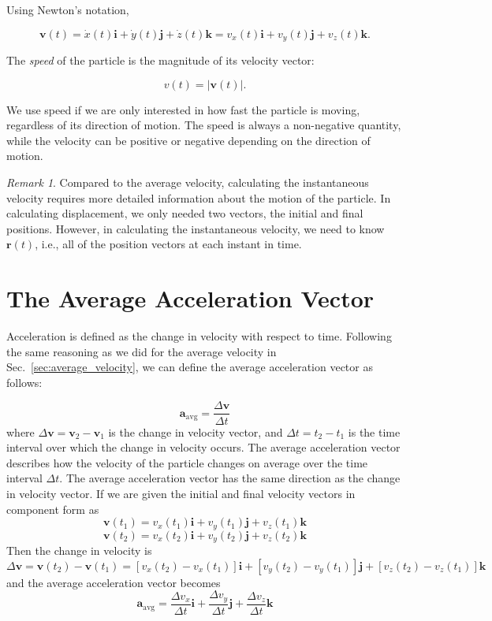 \documentclass[12pt]{article}
\theoremstyle{remark}
\newtheorem*{remark}{Remark}
\begin{document}
Using Newton's notation,

\begin{equation}
\mathbf{v}(t)
=
\dot{x}(t)\mathbf{i}
+
\dot{y}(t)\mathbf{j}
+
\dot{z}(t)\mathbf{k}
=
v_x(t)\mathbf{i}
+
v_y(t)\mathbf{j}
+
v_z(t)\mathbf{k}.
\end{equation}

The \emph{speed} of the particle is the magnitude of its velocity vector:

\begin{equation}
v(t)
=
\lvert\mathbf{v}(t)\rvert.
\end{equation}

We use speed if we are only interested in how fast the particle is moving, regardless of its direction of motion. The speed is always a non-negative quantity, while the velocity can be positive or negative depending on the direction of motion.

\begin{remark}
    Compared to the average velocity, calculating the instantaneous velocity requires more detailed information about the motion of the particle. In calculating displacement, we only needed two vectors, the initial and final positions. However, in calculating the instantaneous velocity, we need to know $\mathbf{r}(t)$, i.e., all of the position vectors at each instant in time.   
\end{remark}



\section{The Average Acceleration Vector}
Acceleration is defined as the change in velocity with respect to time. Following the same reasoning as we did for the average velocity in Sec.~\ref{sec:average_velocity}, we can define the average acceleration vector as follows:

\begin{equation}
\mathbf{a}_\text{avg} = \frac{\Delta \mathbf{v}}{\Delta t}
\end{equation}
where \(\Delta \mathbf{v} = \mathbf{v}_2 - \mathbf{v}_1\) is the change in velocity vector, and \(\Delta t = t_2 - t_1\) is the time interval over which the change in velocity occurs. The average acceleration vector describes how the velocity of the particle changes on average over the time interval \(\Delta t\). The average acceleration vector has the same direction as the change in velocity vector. If we are given the initial and final velocity vectors in component form as
\[
\mathbf{v}(t_1)=v_{x}(t_1)\mathbf{i} + v_{y}(t_1)\mathbf{j} + v_{z}(t_1)\mathbf{k}   
\]
\[
\mathbf{v}(t_2)=v_{x}(t_2)\mathbf{i} + v_{y}(t_2)\mathbf{j} + v_{z}(t_2)\mathbf{k}
\]
Then the change in velocity is
\[
\Delta \mathbf{v} = \mathbf{v}(t_2) - \mathbf{v}(t_1) = [v_{x}(t_2)-v_{x}(t_1)]\mathbf{i} + [v_{y}(t_2)-v_{y}(t_1)]\mathbf{j} + [v_{z}(t_2)-v_{z}(t_1)]\mathbf{k}
\]
and the average acceleration vector becomes
\[
\mathbf{a}_\text{avg}= \frac{\Delta v_x}{\Delta t}\mathbf{i}+\frac{\Delta v_y}{\Delta t}\mathbf{j}+\frac{\Delta v_z}{\Delta t}\mathbf{k}
\]
\end{document}
